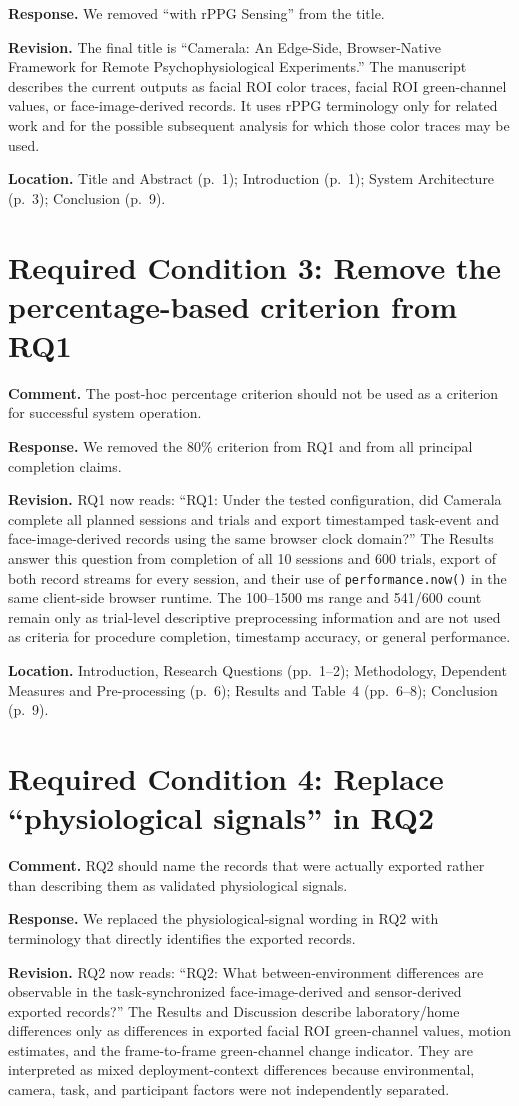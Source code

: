 \documentclass[11pt]{article}
\newcommand{\responseitem}[2]{\section*{#1: #2}}
\begin{document}
\textbf{Response.}
We removed ``with rPPG Sensing'' from the title.

\textbf{Revision.}
The final title is ``Camerala: An Edge-Side, Browser-Native Framework for Remote Psychophysiological Experiments.''
The manuscript describes the current outputs as facial ROI color traces, facial ROI green-channel values, or face-image-derived records.
It uses rPPG terminology only for related work and for the possible subsequent analysis for which those color traces may be used.

\textbf{Location.}
Title and Abstract (p.~1); Introduction (p.~1); System Architecture (p.~3); Conclusion (p.~9).

\responseitem{Required Condition 3}{Remove the percentage-based criterion from RQ1}

\textbf{Comment.}
The post-hoc percentage criterion should not be used as a criterion for successful system operation.

\textbf{Response.}
We removed the 80\% criterion from RQ1 and from all principal completion claims.

\textbf{Revision.}
RQ1 now reads: ``RQ1: Under the tested configuration, did Camerala complete all planned sessions and trials and export timestamped task-event and face-image-derived records using the same browser clock domain?''
The Results answer this question from completion of all 10 sessions and 600 trials, export of both record streams for every session, and their use of \texttt{performance.now()} in the same client-side browser runtime.
The 100--1500 ms range and 541/600 count remain only as trial-level descriptive preprocessing information and are not used as criteria for procedure completion, timestamp accuracy, or general performance.

\textbf{Location.}
Introduction, Research Questions (pp.~1--2); Methodology, Dependent Measures and Pre-processing (p.~6); Results and Table~4 (pp.~6--8); Conclusion (p.~9).

\responseitem{Required Condition 4}{Replace ``physiological signals'' in RQ2}

\textbf{Comment.}
RQ2 should name the records that were actually exported rather than describing them as validated physiological signals.

\textbf{Response.}
We replaced the physiological-signal wording in RQ2 with terminology that directly identifies the exported records.

\textbf{Revision.}
RQ2 now reads: ``RQ2: What between-environment differences are observable in the task-synchronized face-image-derived and sensor-derived exported records?''
The Results and Discussion describe laboratory/home differences only as differences in exported facial ROI green-channel values, motion estimates, and the frame-to-frame green-channel change indicator.
They are interpreted as mixed deployment-context differences because environmental, camera, task, and participant factors were not independently separated.
\end{document}
